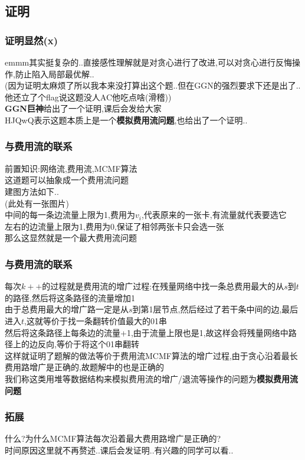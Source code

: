 \documentclass{beamer}
\begin{document}
		\subsection{证明}
			\begin{frame}\frametitle{证明显然(x)}
				emmm其实挺复杂的..直接感性理解就是对贪心进行了改进,可以对贪心进行反悔操作,防止陷入局部最优解..\\
				(因为证明太麻烦了所以我本来没打算出这个题..但在GGN的强烈要求下还是出了..他还立了个flag说这题没人AC他吃点啥(滑稽))\\
				\textbf{GGN巨神}给出了一个证明,课后会发给大家\\
				HJQwQ表示这题本质上是一个\textbf{模拟费用流问题},也给出了一个证明..
			\end{frame}
			\begin{frame}\frametitle{与费用流的联系}
				前置知识:网络流,费用流,MCMF算法\\
				这道题可以抽象成一个费用流问题\\
				建图方法如下..\\
				(此处有一张图片)\\
				中间的每一条边流量上限为1,费用为$v_i$,代表原来的一张卡,有流量就代表要选它\\
				左右的边流量上限为1,费用为0,保证了相邻两张卡只会选一张\\
				那么这显然就是一个最大费用流问题\\
			\end{frame}
			\begin{frame}\frametitle{与费用流的联系}
				每次$k++$的过程就是费用流的增广过程:在残量网络中找一条总费用最大的从$s$到$t$的路径,然后将这条路径的流量增加1\\
				由于总费用最大的增广路一定是从$s$到第1层节点,然后经过了若干条中间的边,最后进入$t$,这就等价于找一条翻转价值最大的01串\\
				然后将这条路径上每条边的流量+1,由于流量上限也是1,故这样会将残量网络中路径上的边反向,等价于将这个01串翻转\\
				这样就证明了题解的做法等价于费用流MCMF算法的增广过程,由于贪心沿着最长费用路增广是正确的,故题解中的也是正确的\\
				我们称这类用堆等数据结构来模拟费用流的增广/退流等操作的问题为\textbf{模拟费用流问题}\\
			\end{frame}
			\begin{frame}\frametitle{拓展}
				什么?为什么MCMF算法每次沿着最大费用路增广是正确的?\\
				时间原因这里就不再赘述..课后会发证明..有兴趣的同学可以看..
			\end{frame}
\end{document}
